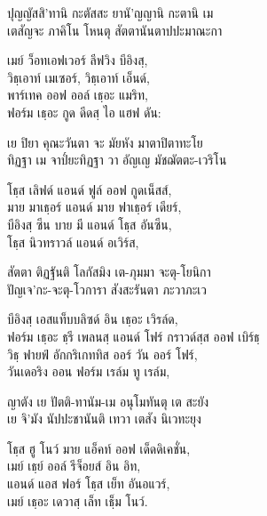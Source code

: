 ปุญญัสสิ’ทานิ กะตัสสะ ยานั’ญญานิ กะตานิ เม\\
เตสัญจะ ภาคิโน โหนตุ สัตตานันตาปปะมาณะกา\\

\begin{english}
เมย์ ว็อทเอฟเวอร์ ลีฟวิง บีอิงสฺ,\\
วิธฺเอาท์ เมเซอร์, วิธฺเอาท์ เอ็นด์,\\
พาร์เทค ออฟ ออล์ เธฺอะ แมริท,\\
ฟอร์ม เธฺอะ กูด ดีดสฺ ไอ แฮฟ ดัน:\\
\end{english}

เย ปิยา คุณะวันตา จะ มัยหัง มาตาปิตาทะโย\\
ทิฏฐา เม จาป๎ยะทิฏฐา วา อัญเญ มัชฌัตตะ-เวริโน\\

\begin{english}
โธฺส เลิฟด์ แอนด์ ฟูล์ ออฟ กูดเน็สส์,\\
มาย มาเธฺอร์ แอนด์ มาย ฟาเธฺอร์ เดียร์,\\
บีอิงสฺ ซีน บาย มี แอนด์ โธฺส อันซีน,\\
โธฺส นิวทราวล์ แอนด์ อเวิร์ส,\\
\end{english}

สัตตา ติฏฐันติ โลกัสมิง เต-ภุมมา จะตุ-โยนิกา\\
ปัญเจ’กะ-จะตุ-โวการา สังสะรันตา ภะวาภะเว\\

\begin{english}
บีอิงสฺ เอสแท็บบลิซด์ อิน เธฺอะ เวิรล์ด,\\
ฟอร์ม เธฺอะ ธฺรี เพลนสฺ แอนด์ โฟร์ กราวด์สฺส ออฟ เบิร์ธฺ\\
วิธฺ ฟายฟ์ อักกริเกททิส ออร์ วัน ออร์ โฟร์,\\
วันเดอริง ออน ฟอร์ม เรล์ม ทู เรล์ม,\\
\end{english}

ญาตัง เย ปัตติ-ทานัม-เม อนุโมทันตุ เต สะยัง\\
เย จิ’มัง นัปปะชานันติ เทวา เตสัง นิเวทะยุง\\
\clearpage

\begin{english}
โธฺส ฮู โนว์ มาย แอ็คท์ ออฟ เด็ดดิเคชั่น,\\
เมย์ เธฺย์ ออล์ รีจ็อยส์ อิน อิท,\\
แอนด์ แอส ฟอร์ โธฺส เย็ท อันอแวร์,\\
เมย์ เธฺอะ เดวาสฺ  เล็ท เธฺ็ม โนว์.\\
\end{english}

